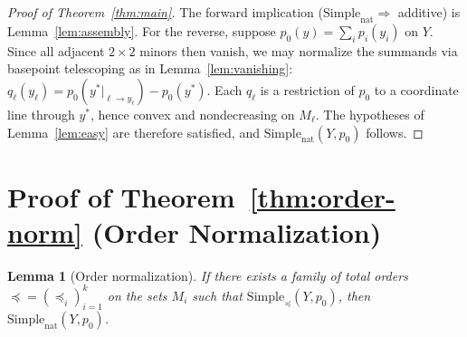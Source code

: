 \documentclass[11pt]{article}
\newtheorem{lemma}[theorem]{Lemma}
\newcommand{\Simplenat}{\mathrm{Simple}_{\mathrm{nat}}}
\newcommand{\Simpleord}{\mathrm{Simple}_{\preceq}}
\begin{document}
\begin{proof}[Proof of Theorem~\ref{thm:main}]
The forward implication ($\Simplenat \Rightarrow$ additive) is Lemma~\ref{lem:assembly}.
For the reverse, suppose $p_0(y) = \sum_i p_i(y_i)$ on $Y$.
Since all adjacent $2 \times 2$ minors then vanish, we may normalize the
summands via basepoint telescoping as in Lemma~\ref{lem:vanishing}:
$q_\ell(y_\ell) = p_0(y^*|_{\ell \to y_\ell}) - p_0(y^*)$.
Each $q_\ell$ is a restriction of $p_0$ to a coordinate line through $y^*$,
hence convex and nondecreasing on $M_\ell$.
The hypotheses of Lemma~\ref{lem:easy} are therefore satisfied,
and $\Simplenat(Y, p_0)$ follows.
\end{proof}

\section{Proof of Theorem~\ref{thm:order-norm} (Order Normalization)}\label{sec:order-norm}

\begin{lemma}[Order normalization]\label{lem:order-norm}
If there exists a family of total orders $\preceq = (\preceq_i)_{i=1}^k$
on the sets $M_i$ such that $\Simpleord(Y, p_0)$, then $\Simplenat(Y, p_0)$.
\end{lemma}
\end{document}
